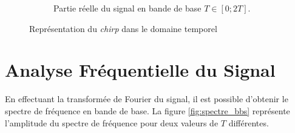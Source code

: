 \begin{figure}[H]
\begin{subfigure}[b]{0.45\textwidth}
    \caption{Partie réelle du signal en bande de base \(T \in [0; 2T]\).}
    \label{subfig:s_BB_entier}
  \end{subfigure}
  \caption{Représentation du \textit{chirp} dans le domaine temporel}
  \label{fig:chirp_temp}
\end{figure}

\section {Analyse Fréquentielle du Signal}

En effectuant la transformée de Fourier du signal, il est possible d'obtenir le spectre de fréquence en bande de base. La figure \ref{fig:spectre_bbs} représente l'amplitude du spectre de fréquence pour deux valeurs de $T$ différentes.

